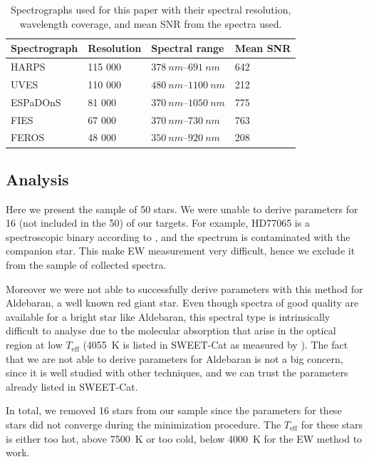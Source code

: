\documentclass{aa}
\begin{document}
\begin{table}[htb!]
    \caption{Spectrographs used for this paper with their spectral resolution,
             wavelength coverage, and mean SNR from the spectra used.}
    \label{tab:instruments}
    \centering
    \begin{tabular}{llll}
      \hline\hline
      Spectrograph & Resolution & Spectral range              &   Mean SNR  \\
      \hline
      HARPS        &    115 000 & $\SIrange{378}{691}{nm}$    &   642       \\
      UVES         &    110 000 & $\SIrange{480}{1100}{nm}$   &   212       \\
      ESPaDOnS     &     81 000 & $\SIrange{370}{1050}{nm}$   &   775       \\
      FIES         &     67 000 & $\SIrange{370}{730}{nm}$    &   763       \\
      FEROS        &     48 000 & $\SIrange{350}{920}{nm}$    &   208       \\
      \hline
    \end{tabular}
\end{table}



\subsection{Analysis}
\label{sec:results}
Here we present the sample of 50 stars. We were unable to derive parameters for
{16 (not included in the 50)} of our targets. For example, HD77065 is a
spectroscopic binary according to \cite{Pourbaix2004}, and the spectrum is
contaminated with the companion star. This make EW measurement very difficult,
hence we exclude it from the sample of collected spectra.

Moreover we were not able to successfully derive parameters with this method for
Aldebaran, a well known red giant star. Even though spectra of good quality are
available for a bright star like Aldebaran, this spectral type is intrinsically
difficult to analyse due to the molecular absorption that arise in the optical
region at low $T_\mathrm{eff}$ (\SI{4055}{K} is listed in SWEET-Cat as measured
by \citet{Hatzes2015}). The fact that we are not able to derive parameters for
Aldebaran is not a big concern, since it is well studied with other techniques,
and we can trust the parameters already listed in SWEET-Cat.

In total, we removed 16 stars from our sample since the parameters for
these stars did not converge during the minimization procedure. The
$T_\mathrm{eff}$ for these stars is either too hot, above \SI{7500}{K} or
too cold, below \SI{4000}{K} for the EW method to work.
\end{document}
